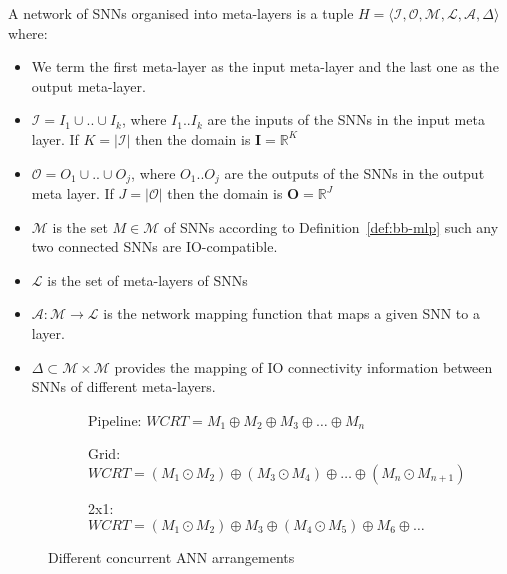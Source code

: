 \begin{definition}
	\label{def:nsanns}
	A network of \acp{SNN} organised into meta-layers is a tuple $H = \langle \mathcal{I}, \mathcal{O}, \mathcal{M}, \mathcal{L}, \mathcal{A}, \Delta \rangle$ where:
	\begin{itemize}
		\item We term the first meta-layer as the input
		meta-layer and the last one as the output
		meta-layer.
		\item  $\mathcal{I}=I_1 \cup .. \cup I_k$,
		where $I_1..I_k$ are the inputs of the \acp{SNN} in
		the input meta layer. If $K=|\mathcal{I}|$ then the
		domain is $\mathbf{I} = \mathbb{R}^K$
		\item $\mathcal{O}=O_1 \cup .. \cup O_j$,
		where $O_1..O_j$ are the outputs of the \acp{SNN} in
		the output meta layer. If $J=|\mathcal{O}|$ then the domain is $\mathbf{O} = \mathbb{R}^J$
		\item $\mathcal{M}$ is the set $M \in \mathcal{M}$ of
		\acp{SNN} according to Definition~\ref{def:bb-mlp}
		such any two connected \acp{SNN} are IO-compatible.
		\item $\mathcal{L}$ is the set of meta-layers of \acp{SNN}
		\item $\mathcal{A}: \mathcal{M} \rightarrow \mathcal{L}$ is the network mapping function that maps a given \ac{SNN} to a layer.
		\item $\Delta \subset \mathcal{M} \times \mathcal{M}$ provides the mapping of IO connectivity information between \acp{SNN} of different meta-layers. %
	\end{itemize}
\end{definition}

\begin{figure}[H]
	\begin{subfigure}[t]{0.5\textwidth}
		\centering
		\scalebox{0.8}{}
		\caption{Pipeline: $WCRT = M_1 \oplus M_2 \oplus M_3 \oplus \ldots \oplus M_n$}
		\label{fig:tca-nn-pipeline}
	\end{subfigure}
	
	\vspace{3mm}
	\begin{subfigure}[t]{0.5\textwidth}
		\centering
		\scalebox{0.8}{}
		\caption{Grid: $WCRT = \left(M_1 \odot M_2\right) \oplus \left(M_3 \odot M_4\right) \oplus \ldots \oplus \left(M_n \odot M_{n+1}\right)$}
		\label{fig:tca-nn-grid}
	\end{subfigure}
	
	\vspace{3mm}
	\begin{subfigure}[t]{0.5\textwidth}
		\centering
		\scalebox{0.8}{}
		\caption{2x1: $WCRT = \left(M_1 \odot M_2\right) \oplus M_3 \oplus \left(M_4 \odot M_5\right) \oplus M_6 \oplus \ldots$}
		\label{fig:tca-nn-someparallel}
	\end{subfigure}
	
	\caption{Different concurrent \ac{ANN} arrangements}
	\label{fig:tca-nn}
\end{figure}

